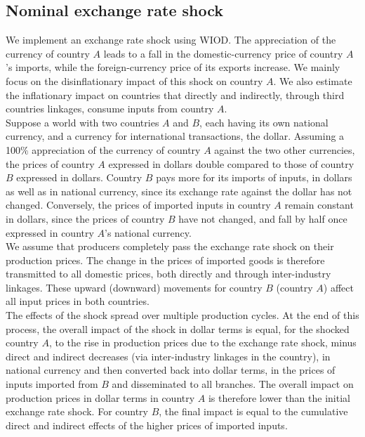 \documentclass[11pt,a4paper]{article}
\begin{document}
\subsection{Nominal exchange rate shock} \label{subsec:chocchange}

We implement an exchange rate shock using WIOD. 
The appreciation of the currency of country $A$ leads to a fall in the domestic-currency price of country $A$'s imports, while the foreign-currency price of its exports increase. 
We mainly focus on the disinflationary impact of this shock on country $A$. 
We also estimate the inflationary impact on countries that directly and indirectly, through third countries linkages, consume inputs from country $A$.\\
Suppose a world with two countries $A$ and $B$, each having its own national currency, and a currency for international transactions, the dollar.
Assuming a 100$\%$ appreciation of the currency of country $A$ against the two other currencies, the prices of country $A$ expressed in dollars double compared to those of country $B$ expressed in dollars. 
Country $B$ pays more for its imports of inputs, in dollars as well as in national currency, since its exchange rate against the dollar has not changed. 
Conversely, the prices of imported inputs in country $A$ remain constant in dollars, since the prices of country $B$ have not changed, and fall by half once expressed in country $A$'s national currency.\\
We assume that producers completely pass the exchange rate shock on their production prices. 
The change in the prices of imported goods is therefore transmitted to all domestic prices, both directly and through inter-industry linkages. 
These upward (downward) movements for country $B$ (country $A$) affect all input prices in both countries.\\
The effects of the shock spread over multiple production cycles. At the end of this process, the overall impact of the shock in dollar terms is equal, for the shocked country $A$, to the rise in production prices due to the exchange rate shock, minus direct and indirect decreases (via inter-industry linkages in the country), in national currency and then converted back into dollar terms, in the prices of inputs imported from $B$ and disseminated to all branches. 
The overall impact on production prices in dollar terms in country $A$ is therefore lower than the initial exchange rate shock. 
For country $B$, the final impact is equal to the cumulative direct and indirect effects of the higher prices of imported inputs.\\
\end{document}
